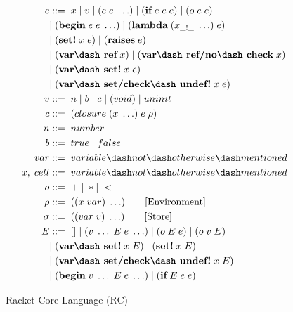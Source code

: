 \begin{figure}[h]
  \begin{mdframed}
    \begin{align*}
      e &::=\; x\; |\; v\; |\; (e\; e\; \ldots)\; |\; (\textbf{if}\; e\; e\; e)\; |\; (o\; e\; e)\; \\
      \; &|\; (\textbf{begin}\; e\; e\; \ldots)\; |\; (\textbf{lambda}\; (x_{\_!\_}\; \ldots)\; e)\\
      \; &|\; (\textbf{set!}\; x\; e)\; |\; (\textbf{raises}\; e)\\
      \; &|\; (\textbf{var\dash ref}\; x)\; |\; (\textbf{var\dash ref/no\dash check}\; x) \\
      \; &|\; (\textbf{var\dash set!}\; x\; e)  \\
      \; &|\; (\textbf{var\dash set/check\dash undef!}\; x\; e) \\
      v   &::=\; n\; |\; b\; |\; c\; |\; (void)\;|\; uninit \\ %
      c   &::=\; (closure\; (x\; \ldots)\; e\; \rho) \\
      n   &::=\; number \\
      b   &::=\; true\; |\; false \\
      var &::=\; variable\dash not\dash otherwise\dash mentioned \\ %
      x,\; cell &::=\; variable\dash not\dash otherwise\dash mentioned \\ %
      o  &::=\; +\; |\; * |\; < \\
      \rho   &::=\; ((x\; var)\; \ldots) \tag*{[Environment]}\\
      \sigma   &::=\; ((var\; v)\; \ldots) \tag*{[Store]}\\
      E   &::=\; []\; |\; (v\; \ldots\; E\; e\; \ldots)\; |\; (o\; E\; e)\; |\; (o\; v\; E) \\
      \;  &|\; (\textbf{var\dash set!}\; x\; E)\; |\; (\textbf{set!}\; x\; E)\; \\
      \;  &|\; (\textbf{var\dash set/check\dash undef!}\; x\; E) \\
      \;  &|\; (\textbf{begin}\; v\; \ldots\; E\; e\; \ldots)\; |\; (\textbf{if}\; E\; e\; e)
    \end{align*}
    \caption{Racket Core Language (RC)}
    \label{fig:racket-source}
  \end{mdframed}
\end{figure}

